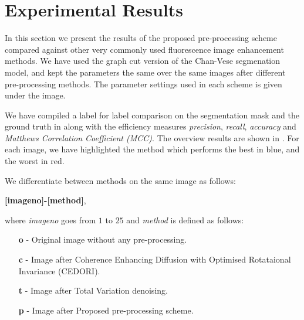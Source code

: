 
\section{Experimental Results}
\label{sec:preprocessschemeexperimentalresults}

In this section we present the results of the  proposed pre-processing scheme compared against other very commonly used fluorescence image enhancement methods. We have used the graph cut version of the Chan-Vese segmenation model, and kept the parameters the same over the same images after different pre-processing methods. The parameter settings used in each scheme is given under the image.

We have compiled a label for label comparison on the segmentation mask and the ground truth in  along with the efficiency measures \textit{precision}, \textit{recall}, \textit{accuracy} and \textit{Matthews Correlation Coefficient (MCC)}. The overview results are shown in . For each image, we have highlighted the method which performs the best in blue, and the worst in red.

We differentiate between methods on the same image as follows:

\textbf{[imageno]-[method]}, 

where \textit{imageno} goes from $1$ to $25$ and \textit{method} is defined as follows:
\begin{enumerate}
	\item [\textbf{o}] - Original image without any pre-processing.
	\item [\textbf{c}] - Image after Coherence Enhancing Diffusion with Optimised Rotataional Invariance (CEDORI).
	\item [\textbf{t}] - Image after Total Variation denoising.
	\item [\textbf{p}] - Image after Proposed pre-processing scheme.
\end{enumerate}

